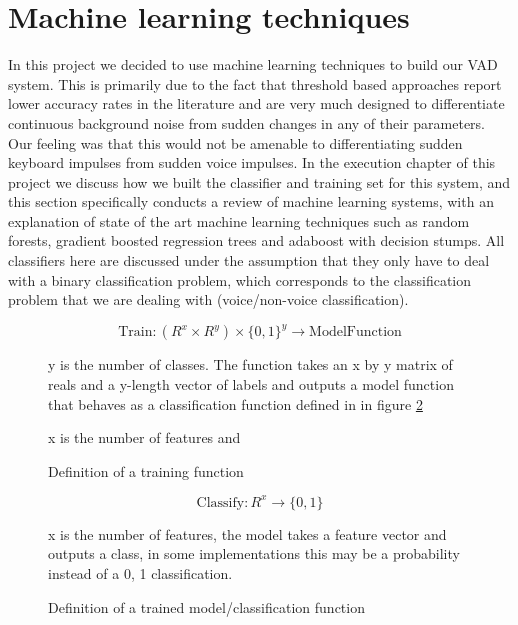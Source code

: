 \documentclass[ %
                    author={Sam Phippen},
                supervisor={Dr. Rafal Bogacz},
                     title={Real time voice activity detectors in noisy personal computing environments},
                  subtitle={},
                    degree={MEng},
                      year={2012} ]{thesis}
\begin{document}
\section{Machine learning techniques}

In this project we decided to use machine learning techniques to build our VAD
system. This is primarily due to the fact that threshold based approaches
report lower accuracy rates in the literature and are very much designed to
differentiate continuous background noise from sudden changes in any of their
parameters. Our feeling was that this would not be amenable to differentiating
sudden keyboard impulses from sudden voice impulses. In the execution chapter
of this project we discuss how we built the classifier and training set for
this system, and this section specifically conducts a review of machine
learning systems, with an explanation of state of the art machine learning
techniques such as random forests, gradient boosted regression trees and
adaboost with decision stumps. All classifiers here are discussed under the
assumption that they only have to deal with a binary classification problem,
which corresponds to the classification problem that we are dealing with
(voice/non-voice classification).

\begin{figure}
    $$\text{Train}:(R^x \times R^y) \times \{0,1\}^y \rightarrow \text{ModelFunction}$$

    y is the number of classes. The function takes an x by y matrix of reals
    and a y-length vector of labels and outputs a model function that behaves
    as a classification function defined in in figure \ref{eqn:define-classify}

    \caption{Definition of a training function} x is the number of features and

    \label{eqn:define-train}
\end{figure}

\begin{figure}
    $$\text{Classify}: R^x \rightarrow \{0,1\}$$

    x is the number of features, the model takes a feature vector and outputs a
    class, in some implementations this may be a probability instead of a {0, 1}
    classification.

    \caption{Definition of a trained model/classification function}

    \label{eqn:define-classify}
\end{figure}
\end{document}

